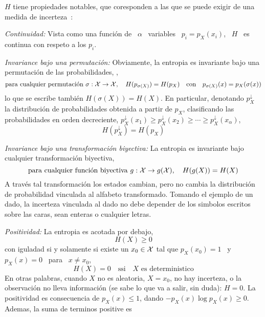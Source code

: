 $H$ tiene propiedades notables, que coresponden a las que se puede exigir de una
medida de incerteza~\cite{Sha48, ShaWea64, CovTho06, Rio07, DemCov91, Joh04}:
%
\begin{propiedades}
\item\label{prop:SZ:continuidad} {\it Continuidad:}  Vista como una funci\'on de
  \ $\alpha$ \ variables  \ $p_i = p_X(x_i)$, \ $H$ \  es continua con respeto a
  los $p_i$.
%
\setcounter{PropPermutacion}{\value{enumi}}
\item\label{prop:SZ:permutacion}   {\it  Invariance  bajo   una  permutaci\'on:}
  Obviamente,  la   entropia  es  invariante  bajo  una   permutaci\'on  de  las
  probabilidades, \ie,
  \[
  \mbox{para cualquier  permutaci\'on } \sigma:  \mathcal{X} \to \mathcal{X}, \quad  H(p_{\sigma(X)}) =
  H(p_X) \quad \mbox{con} \quad p_{\sigma(X)}(x) = p_X(\sigma(x))
  \]
  lo que se  escribe tambi\'en $H(\sigma(X)) = H(X)$.   En particular, denotando
  $p_X^\downarrow$ la  distribuci\'on de probabilidades obtenida a  partir de $p_X$,
  clasificando las  probabilidades en orden  decreciente, $p_X^\downarrow(x_1) \ge
  p_X^\downarrow(x_2) \ge \cdots  \ge p_X^\downarrow(x_\alpha)$,
  \[
  H(p_X^\downarrow) = H(p_X)
  \]
%
\setcounter{PropBiyeccion}{\value{enumi}}
\item\label{prop:SZ:biyeccion}   {\it  Invariance   bajo   una  transformaci\'on
    biyectiva:}  La  entropia  es  invariante  bajo  cualquier  transformaci\'on
  biyectiva, \ie
  \[
  \mbox{para cualquier  funci\'on biyectiva } g:  \mathcal{X} \to g(\mathcal{X}),  \quad H(g(X)) =
  H(X)
  \]
  A  trav\'es  tal transformaci\'on  los  estados  cambian,  pero no  cambia  la
  distribuci\'on de probabilidad vinculada al alfabeto transformado.  Tomando el
  ejemplo de  un dado, la  incerteza vinculada al  dado no debe depender  de los
  simbolos escritos sobre las caras, sean enteras o cualquier letras.
%
\item\label{prop:SZ:positividad} {\it  Positividad:} La entropia  es acotada por
  debajo,
  \[
  H(X) \ge 0 
  \]
  con iguladad si y solamente si existe un $x_0 \in \mathcal{X}$ tal que $p_X(x_0) = 1$ \
  y \  $p_X(x) = 0$ \ para  \ $x \ne x_0$,
  \[
  H(X)  =  0 \quad  \mbox{ssi}  \quad X  \mbox{  es  deterministico}
  \]
  En  otras  palabras, cuando  $X$  no  es aleatoria,  \ie  $X  =  x_0$, no  hay
  incerteza, o  la observaci\'on  no lleva  informaci\'on (se sabe  lo que  va a
  salir, sin duda): $H = 0$.   La positividad es consecuencia de $p_X(x) \le 1$,
  dando $- p_X(x)  \log p_X(x) \ge 0$.  Ademas, la suma  de terminos positive es

\end{propiedades}
